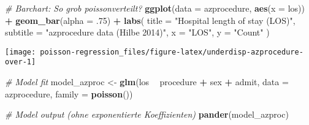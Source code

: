 \documentclass[ngerman,a4paper,]{scrartcl}
\newenvironment{Shaded}{\begin{snugshade}}{\end{snugshade}}
\newcommand{\CommentTok}[1]{\textcolor[rgb]{0.56,0.35,0.01}{\textit{#1}}}
\newcommand{\DataTypeTok}[1]{\textcolor[rgb]{0.13,0.29,0.53}{#1}}
\newcommand{\FloatTok}[1]{\textcolor[rgb]{0.00,0.00,0.81}{#1}}
\newcommand{\KeywordTok}[1]{\textcolor[rgb]{0.13,0.29,0.53}{\textbf{#1}}}
\newcommand{\NormalTok}[1]{#1}
\newcommand{\OperatorTok}[1]{\textcolor[rgb]{0.81,0.36,0.00}{\textbf{#1}}}
\newcommand{\StringTok}[1]{\textcolor[rgb]{0.31,0.60,0.02}{#1}}
\theoremstyle{definition}
\theoremstyle{definition}
\theoremstyle{definition}
\theoremstyle{remark}
\begin{document}
\begin{Shaded}
\begin{Highlighting}[]
\CommentTok{# Barchart: So grob poissonverteilt?}
\KeywordTok{ggplot}\NormalTok{(}\DataTypeTok{data =}\NormalTok{ azprocedure, }\KeywordTok{aes}\NormalTok{(}\DataTypeTok{x =}\NormalTok{ los)) }\OperatorTok{+}
\StringTok{  }\KeywordTok{geom_bar}\NormalTok{(}\DataTypeTok{alpha =} \FloatTok{.75}\NormalTok{) }\OperatorTok{+}
\StringTok{  }\KeywordTok{labs}\NormalTok{(}
    \DataTypeTok{title =} \StringTok{"Hospital length of stay (LOS)"}\NormalTok{,}
    \DataTypeTok{subtitle =} \StringTok{"azprocedure data (Hilbe 2014)"}\NormalTok{,}
    \DataTypeTok{x =} \StringTok{"LOS"}\NormalTok{, }\DataTypeTok{y =} \StringTok{"Count"} 
\NormalTok{  )}
\end{Highlighting}
\end{Shaded}

\begin{center}\texttt{[image: poisson-regression\_files/figure-latex/underdisp-azprocedure-over-1]} \end{center}

\begin{Shaded}
\begin{Highlighting}[]
\CommentTok{# Model fit}
\NormalTok{model_azproc <-}\StringTok{ }\KeywordTok{glm}\NormalTok{(los }\OperatorTok{~}\StringTok{ }\NormalTok{procedure }\OperatorTok{+}\StringTok{ }\NormalTok{sex }\OperatorTok{+}\StringTok{ }\NormalTok{admit, }
                    \DataTypeTok{data =}\NormalTok{ azprocedure, }\DataTypeTok{family =} \KeywordTok{poisson}\NormalTok{())}
 
\CommentTok{# Model output (ohne exponentierte Koeffizienten)}
\KeywordTok{pander}\NormalTok{(model_azproc)}
\end{Highlighting}
\end{Shaded}
\end{document}
